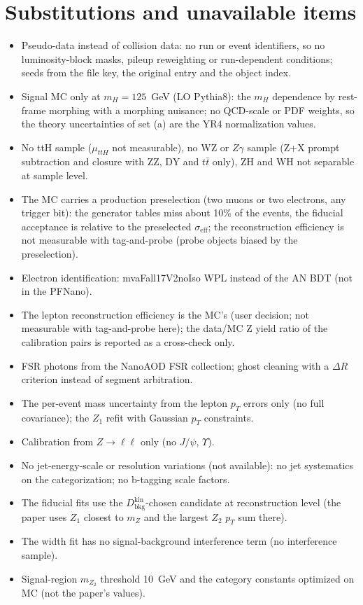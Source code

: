 \documentclass[11pt,a4paper]{article}
\begin{document}
\section{Substitutions and unavailable items}\label{sec:subst}
\begin{itemize}
\item Pseudo-data instead of collision data: no run or event identifiers, so no luminosity-block masks, pileup reweighting or run-dependent conditions; seeds from the file key, the original entry and the object index.
\item Signal MC only at $m_H=125$~GeV (LO Pythia8): the $m_H$ dependence by rest-frame morphing with a morphing nuisance; no QCD-scale or PDF weights, so the theory uncertainties of set (a) are the YR4 normalization values.
\item No ttH sample ($\mu_{ttH}$ not measurable), no WZ or $Z\gamma$ sample (Z+X prompt subtraction and closure with ZZ, DY and $t\bar t$ only), ZH and WH not separable at sample level.
\item The MC carries a production preselection (two muons or two electrons, any trigger bit): the generator tables miss about 10\% of the events, the fiducial acceptance is relative to the preselected $\sigma_{\text{eff}}$; the reconstruction efficiency is not measurable with tag-and-probe (probe objects biased by the preselection).
\item Electron identification: mvaFall17V2noIso WPL instead of the AN BDT (not in the PFNano).
\item The lepton reconstruction efficiency is the MC's (user decision; not measurable with tag-and-probe here); the data/MC Z yield ratio of the calibration pairs is reported as a cross-check only.
\item FSR photons from the NanoAOD FSR collection; ghost cleaning with a $\Delta R$ criterion instead of segment arbitration.
\item The per-event mass uncertainty from the lepton $p_T$ errors only (no full covariance); the $Z_1$ refit with Gaussian $p_T$ constraints.
\item Calibration from $Z\to\ell\ell$ only (no $J/\psi$, $\Upsilon$).
\item No jet-energy-scale or resolution variations (not available): no jet systematics on the categorization; no b-tagging scale factors.
\item The fiducial fits use the $D_{\text{bkg}}^{\text{kin}}$-chosen candidate at reconstruction level (the paper uses $Z_1$ closest to $m_Z$ and the largest $Z_2$ $p_T$ sum there).
\item The width fit has no signal-background interference term (no interference sample).
\item Signal-region $m_{Z_2}$ threshold 10~GeV and the category constants optimized on MC (not the paper's values).
\end{itemize}
\end{document}
